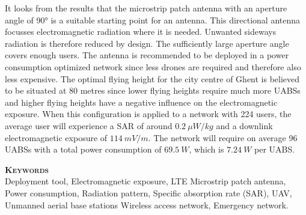 It looks from the results that 
the microstrip patch antenna with an aperture angle of \ang{90} is a suitable starting point for an antenna. 
This directional antenna focusses electromagnetic radiation where it is needed. Unwanted sideways radiation 
is therefore reduced by design.
The sufficiently large aperture angle covers enough users. The antenna is recommended to be deployed in a power consumption 
optimized network since less drones are required and therefore also less expensive.
The optimal flying height for the city centre of Ghent is believed to be situated at 80 metres since lower flying heights require much more UABSs and
higher flying heights have a negative influence on the electromagnetic exposure.  
When this configuration is applied to a network with 224 users, the average user will 
experience a SAR of around $0.2\ \mu W/kg$ and
 a downlink electromagnetic exposure of $114\ mV/m$. The network will require on average 96 UABSs with a total
power consumption of $69.5\ W$, which is $7.24\ W$ per UABS.

\textsc{\textbf{\LARGE Keywords}}\\
Deployment tool,  Electromagnetic exposure, LTE
Microstrip patch antenna, Power consumption,
Radiation pattern, Specific absorption rate (SAR),
UAV, Unmanned aerial base stations
Wireless access network, Emergency network.